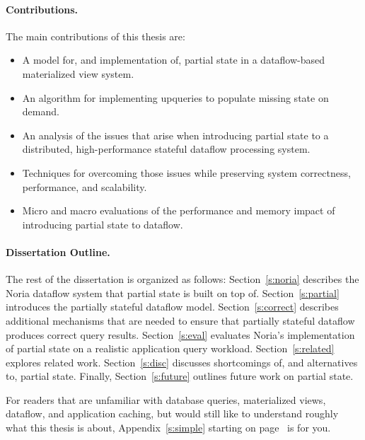 


\paragraph{Contributions.}

The main contributions of this thesis are:

\begin{itemize}
 \item A model for, and implementation of, partial state in a dataflow-based
   materialized view system.
 \item An algorithm for implementing upqueries to populate missing state on
   demand.
 \item An analysis of the issues that arise when introducing partial state to a
   distributed, high-performance stateful dataflow processing system.
 \item Techniques for overcoming those issues while preserving system
	 correctness, performance, and scalability.
 \item Micro and macro evaluations of the performance and memory impact of
	 introducing partial state to dataflow.
\end{itemize}

\paragraph{Dissertation Outline.}

The rest of the dissertation is organized as follows: Section~\ref{s:noria}
describes the Noria dataflow system that partial state is built on top of.
Section~\ref{s:partial} introduces the partially stateful dataflow model.
Section~\ref{s:correct} describes additional mechanisms that are needed to
ensure that partially stateful dataflow produces correct query results.
Section~\ref{s:eval} evaluates Noria's implementation of partial state on a
realistic application query workload. Section~\ref{s:related} explores related
work. Section~\ref{s:disc} discusses shortcomings of, and alternatives to,
partial state. Finally, Section~\ref{s:future} outlines future work on partial
state.

For readers that are unfamiliar with database queries, materialized views,
dataflow, and application caching, but would still like to understand roughly
what this thesis is about, Appendix~\ref{s:simple} starting on
page~\pageref{s:simple} is for you.

